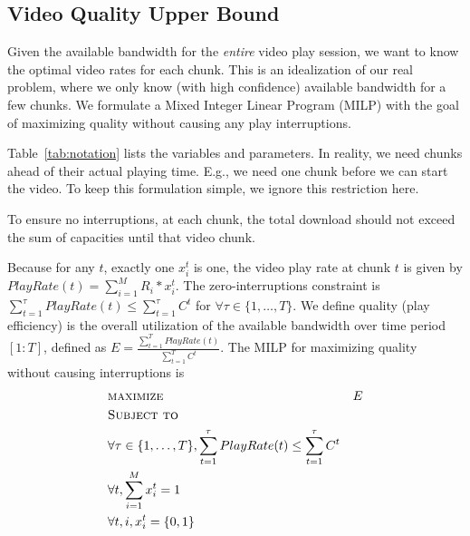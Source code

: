 \subsection{Video Quality Upper Bound}\label{subsec:offline}


Given the available bandwidth for the \emph{entire} video play
session, we want to know the optimal video rates for each chunk. This
is an idealization of our real problem, where we only know (with high
confidence) available bandwidth for a few chunks.
We formulate a Mixed Integer Linear Program (MILP) with the goal of
maximizing quality without causing any play interruptions. 

Table~\ref{tab:notation} lists the variables and parameters.
In reality, we need chunks ahead of their actual playing
time. E.g., we need one chunk before we can start the video. To keep
this formulation simple, we ignore this restriction here.

To ensure  no interruptions, at each chunk, the total download
should not exceed the sum of capacities until that video chunk.



Because for any $t$, exactly one $x_i^t$ is one, the video play rate 
at chunk $t$ is given by 
$PlayRate(t) = \sum \limits_{i=1}^M R_i *  x_i^t$. 
The zero-interruptions constraint is 
$\sum \limits_{t=1}^\tau  PlayRate(t) \leq\sum\limits_{t=1}^\tau C^t$
for $\forall \tau \in \{1, \dots, T\}$.
We define quality (play efficiency) 
is the overall utilization of the available bandwidth
over time period $[1:T]$, defined as
$E =\frac{\sum\limits_{t=1}^T  PlayRate(t)}{\sum\limits_{t=1}^T C^t}$. 
The MILP for maximizing quality without causing interruptions is
\begin{subequations}
\begin{align*}
&\textsc{maximize }&{E}\\ 
&\textsc{Subject to}\\
&\forall \tau \in \{1, \dots, T\}, \sum \limits_{t=1}^\tau  PlayRate(t)
\leq\sum\limits_{t=1}^\tau C^t \\
& \forall t, \sum \limits_{i=1}^M x_i^t =1\ \\
& \forall t, i, x_i^t = \{0,1\}
\end{align*}
\end{subequations}


